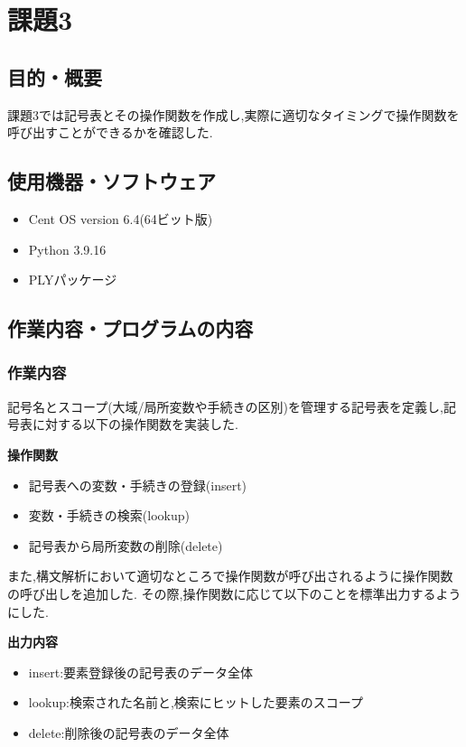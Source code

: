 \documentclass[main]{subfiles}
\begin{document}
\chapter{課題3}
\section{目的・概要}
課題3では記号表とその操作関数を作成し,実際に適切なタイミングで操作関数を呼び出すことができるかを確認した.

\section{使用機器・ソフトウェア}
\begin{itemize}
    \item Cent OS version 6.4(64ビット版)
    \item Python 3.9.16
    \item PLYパッケージ
\end{itemize}

\section{作業内容・プログラムの内容}
\subsection{作業内容}
記号名とスコープ(大域/局所変数や手続きの区別)を管理する記号表を定義し,記号表に対する以下の操作関数を実装した.
\begin{oframed}
\textbf{操作関数}
\begin{itemize}
    \item 記号表への変数・手続きの登録(insert)
    \item 変数・手続きの検索(lookup)
    \item 記号表から局所変数の削除(delete)
\end{itemize}
\end{oframed}
また,構文解析において適切なところで操作関数が呼び出されるように操作関数の呼び出しを追加した.
その際,操作関数に応じて以下のことを標準出力するようにした.
\begin{oframed}
\textbf{出力内容}
\begin{itemize}
    \item insert:要素登録後の記号表のデータ全体
    \item lookup:検索された名前と,検索にヒットした要素のスコープ
    \item delete:削除後の記号表のデータ全体
\end{itemize}
\end{oframed}
\end{document}
